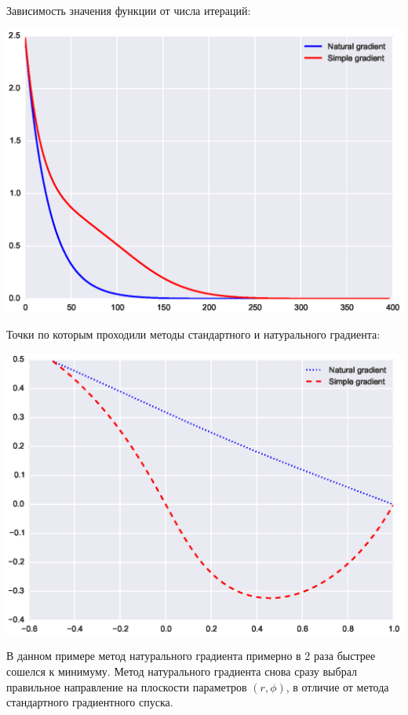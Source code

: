 \documentclass[a4paper,12pt]{article}
\begin{document}
        Зависимость значения функции от числа итераций:
        \begin{flushleft}
            \includegraphics[scale=0.8, trim=1.5cm 0 0 0]{figure_6}
        \end{flushleft}

        \newpage

        Точки по которым проходили методы стандартного и натурального градиента:
        \begin{flushleft}
            \includegraphics[scale=0.8, trim=1.5cm 0 0 0]{figure_66}
        \end{flushleft}

        В данном примере метод натурального градиента примерно в 2 раза быстрее сошелся к минимуму.
        Метод натурального градиента снова сразу выбрал правильное направление на плоскости параметров $(r, \phi)$, 
        в отличие от метода стандартного градиентного спуска.
\end{document}

